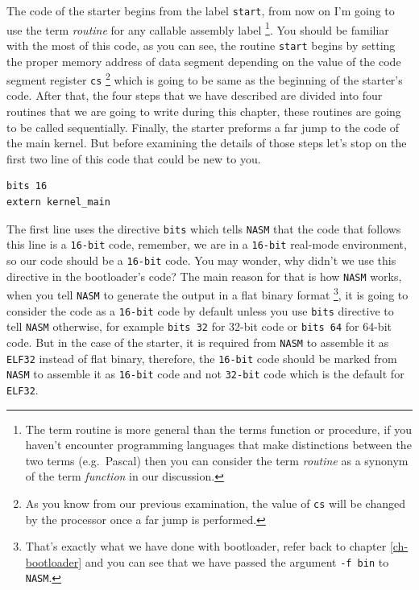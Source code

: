 The code of the starter begins from the label \lstinline!start!, from
now on I'm going to use the term \emph{routine} for any callable
assembly label \footnote{The term routine is more general than the terms
  function or procedure, if you haven't encounter programming languages
  that make distinctions between the two terms (e.g.~Pascal) then you
  can consider the term \emph{routine} as a synonym of the term
  \emph{function} in our discussion.}. You should be familiar with the
most of this code, as you can see, the routine \lstinline!start! begins
by setting the proper memory address of data segment depending on the
value of the code segment register \lstinline!cs! \footnote{As you know
  from our previous examination, the value of \lstinline!cs! will be
  changed by the processor once a far jump is performed.} which is going
to be same as the beginning of the starter's code. After that, the four
steps that we have described are divided into four routines that we are
going to write during this chapter, these routines are going to be
called sequentially. Finally, the starter preforms a far jump to the
code of the main kernel. But before examining the details of those steps
let's stop on the first two line of this code that could be new to you.

\begin{lstlisting}
bits 16
extern kernel_main
\end{lstlisting}

The first line uses the directive \lstinline!bits! which tells
\lstinline!NASM! that the code that follows this line is a
\lstinline!16-bit! code, remember, we are in a \lstinline!16-bit!
real-mode environment, so our code should be a \lstinline!16-bit! code.
You may wonder, why didn't we use this directive in the bootloader's
code? The main reason for that is how \lstinline!NASM! works, when you
tell \lstinline!NASM! to generate the output in a flat binary format
\footnote{That's exactly what we have done with bootloader, refer back
  to chapter \ref{ch-bootloader} and you can see that we have passed the
  argument \lstinline!-f bin! to \lstinline!NASM!.}, it is going to
consider the code as a \lstinline!16-bit! code by default unless you use
\lstinline!bits! directive to tell \lstinline!NASM! otherwise, for
example \lstinline!bits 32! for 32-bit code or \lstinline!bits 64! for
64-bit code. But in the case of the starter, it is required from
\lstinline!NASM! to assemble it as \lstinline!ELF32! instead of flat
binary, therefore, the \lstinline!16-bit! code should be marked from
\lstinline!NASM! to assemble it as \lstinline!16-bit! code and not
\lstinline!32-bit! code which is the default for \lstinline!ELF32!.

